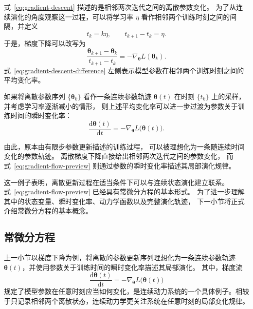 式~\eqref{eq:gradient-descent} 描述的是相邻两次迭代之间的离散参数变化。
为了从连续演化的角度观察这一过程，可以将学习率 \(\eta\)
看作相邻两个训练时刻之间的间隔，并定义
\begin{equation}
    t_k=k\eta,
    \qquad
    t_{k+1}-t_k=\eta.
    \label{eq:training-time}
\end{equation}
于是，梯度下降可以改写为
\begin{equation}
    \frac{
        \boldsymbol{\theta}_{k+1}
        -
        \boldsymbol{\theta}_k
    }{
        t_{k+1}-t_k
    }
    =
    -
    \nabla_{\boldsymbol{\theta}}
    L(\boldsymbol{\theta}_k).
    \label{eq:gradient-descent-difference}
\end{equation}
式~\eqref{eq:gradient-descent-difference} 左侧表示模型参数在相邻两个训练时刻之间的
平均变化率。

如果将离散参数序列
\(\{\boldsymbol{\theta}_k\}\)
看作一条连续参数轨迹
\(\boldsymbol{\theta}(t)\)
在时刻 \(\{t_k\}\) 上的采样，并考虑学习率逐渐减小的情形，
则上述平均变化率可以进一步过渡为参数关于训练时间的瞬时变化率：
\begin{equation}
    \frac{
        \mathrm{d}\boldsymbol{\theta}(t)
    }{
        \mathrm{d}t
    }
    =
    -
    \nabla_{\boldsymbol{\theta}}
    L\bigl(\boldsymbol{\theta}(t)\bigr).
    \label{eq:gradient-flow-preview}
\end{equation}

由此，原本由有限步参数更新描述的训练过程，
可以被理想化为一条随连续时间变化的参数轨迹。
离散梯度下降直接给出相邻两次迭代之间的参数变化，
而式~\eqref{eq:gradient-flow-preview}
则通过参数的瞬时变化率描述其局部演化规律。

这一例子表明，离散更新过程在适当条件下可以与连续状态演化建立联系。
式~\eqref{eq:gradient-flow-preview}
已经具有常微分方程的基本形式。
为了进一步理解其中的状态变量、瞬时变化率、动力学函数以及完整演化轨迹，
下一小节将正式介绍常微分方程的基本概念。



\subsection{常微分方程}
上一小节以梯度下降为例，将离散的参数更新序列理想化为一条连续参数轨迹
\(\boldsymbol{\theta}(t)\)，并使用参数关于训练时间的瞬时变化率描述其局部演化。
其中，梯度流
\begin{equation}
    \frac{\mathrm{d}\boldsymbol{\theta}(t)}{\mathrm{d}t}
    =
    -
    \nabla_{\boldsymbol{\theta}}
    L\bigl(\boldsymbol{\theta}(t)\bigr)
\end{equation}
规定了模型参数在任意时刻应当如何变化，是连续动力系统的一个具体例子。相较于只记录相邻两个离散状态，连续动力学更关注系统在任意时刻的局部变化规律。


